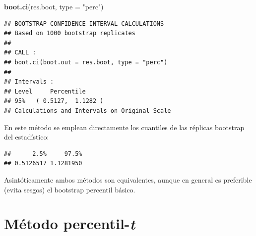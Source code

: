 \documentclass[
]{book}
\newenvironment{Shaded}{\begin{snugshade}}{\end{snugshade}}
\newcommand{\AttributeTok}[1]{\textcolor[rgb]{0.13,0.29,0.53}{#1}}
\newcommand{\CommentTok}[1]{\textcolor[rgb]{0.56,0.35,0.01}{\textit{#1}}}
\newcommand{\DecValTok}[1]{\textcolor[rgb]{0.00,0.00,0.81}{#1}}
\newcommand{\FunctionTok}[1]{\textcolor[rgb]{0.13,0.29,0.53}{\textbf{#1}}}
\newcommand{\NormalTok}[1]{#1}
\newcommand{\OtherTok}[1]{\textcolor[rgb]{0.56,0.35,0.01}{#1}}
\newcommand{\SpecialCharTok}[1]{\textcolor[rgb]{0.81,0.36,0.00}{\textbf{#1}}}
\newcommand{\StringTok}[1]{\textcolor[rgb]{0.31,0.60,0.02}{#1}}
\theoremstyle{break}
\theoremstyle{nonumberplain}
\renewcommand{\CommentTok}[1]{\textcolor[rgb]{0.41,0.41,0.41}{\texttt{#1}}}
\begin{document}
\begin{Shaded}
\begin{Highlighting}[]
\FunctionTok{boot.ci}\NormalTok{(res.boot, }\AttributeTok{type =} \StringTok{"perc"}\NormalTok{)}
\end{Highlighting}
\end{Shaded}

\begin{verbatim}
## BOOTSTRAP CONFIDENCE INTERVAL CALCULATIONS
## Based on 1000 bootstrap replicates
## 
## CALL : 
## boot.ci(boot.out = res.boot, type = "perc")
## 
## Intervals : 
## Level     Percentile     
## 95%   ( 0.5127,  1.1282 )  
## Calculations and Intervals on Original Scale
\end{verbatim}

En este método se emplean directamente los cuantiles de las
réplicas bootstrap del estadístico:

\begin{Shaded}
\end{Shaded}

\begin{verbatim}
##      2.5%     97.5% 
## 0.5126517 1.1281950
\end{verbatim}

Asintóticamente ambos métodos son equivalentes, aunque en general
es preferible (evita sesgos) el bootstrap percentil básico.

\section{\texorpdfstring{Método percentil-\emph{t}}{Método percentil-t}}\label{icboot-perc-t}
\end{document}
